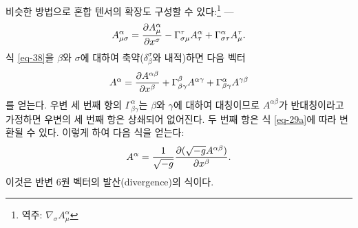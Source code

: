 비슷한 방법으로 혼합 텐서의 확장도 구성할 수 있다:\footnote{역주: $\nabla_\sigma A_{\mu}^{\alpha}$} ---
\begin{equation} \label{eq-39}
	A_{\mu\sigma}^{\alpha}
	= {\frac{{\partial}{A_{\mu}^{\alpha}}}{{\partial}{x^\sigma}}}
	- \Gamma_{\sigma\mu}^\tau A_{\tau}^{\alpha} 
	+ \Gamma_{\sigma\tau}^\alpha A_{\mu}^{\tau}.
\end{equation}
식 \eqref{eq-38}을 \Index{} $\beta$와 $\sigma$에 대하여 축약($\delta_\beta^\sigma$와 내적)하면 다음 벡터
\begin{equation*}
	A^\alpha = {\frac{{\partial}{A^{\alpha\beta}}}{{\partial}{x^\beta}}}
	+ \Gamma_{\beta\gamma}^\beta A^{\alpha\gamma}
	+ \Gamma_{\beta\gamma}^\alpha A^{\gamma\beta} 
\end{equation*}
를 얻는다. 우변 세 번째 항의 $\Gamma_{\beta\gamma}^\alpha$는 \Index{} $\beta$와 $\gamma$에 대하여 대칭이므로 $A^{\alpha\beta}$가 반대칭이라고 가정하면 우변의 세 번째 항은 상쇄되어 없어진다. 두 번째 항은 식 \eqref{eq-29a}에 따라 변환될 수 있다. 이렇게 하여 다음 식을 얻는다:
\begin{equation} \label{eq-40}
	A^\alpha = \frac{1}{\sqrt{-g}}{\frac{{\partial}{(\sqrt{-g}A^{\alpha\beta})}}{{\partial}{x^\beta}}}.
\end{equation}
이것은 반변 6원 벡터의 발산(divergence)의 식이다.

